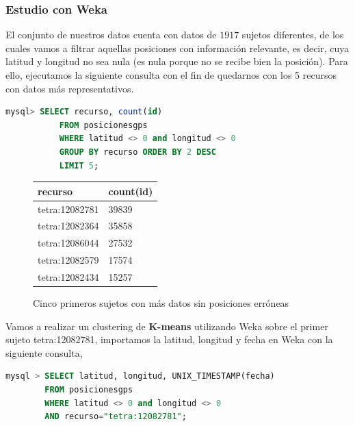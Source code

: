 \documentclass[a4paper, 12pt]{article}
\begin{document}
\subsubsection{Estudio con Weka}

El conjunto de nuestros datos cuenta con datos de $1917$ sujetos diferentes, de los cuales vamos a filtrar aquellas posiciones con informaci\'on relevante, es decir, cuya latitud y longitud no sea nula (es nula porque no se recibe bien la posici\'on). Para ello, ejecutamos la siguiente consulta con el fin de quedarnos con los 5 recursos con datos m\'as representativos.

\begin{lstlisting}[language=sql, basicstyle=\small, columns=fullflexible]
mysql> SELECT recurso, count(id)
           FROM posicionesgps
           WHERE latitud <> 0 and longitud <> 0
           GROUP BY recurso ORDER BY 2 DESC 
           LIMIT 5;

\end{lstlisting}


\begin{figure}[!htbp]
	\begin{center}
		\begin{tabular}{|l | l |}
			\hline
		\rowcolor{LightCyan}
		   \hline
           recurso & count(id) \\
           \hline
           tetra:12082781 & 39839 \\
           tetra:12082364 & 35858 \\
           tetra:12086044 & 27532 \\
           tetra:12082579 & 17574 \\
		   tetra:12082434 & 15257 \\		
		   \hline
		\end{tabular}
	\caption{Cinco primeros sujetos con m\'as datos sin posiciones err\'oneas}
	\end{center}
\end{figure}


Vamos a realizar un clustering de \textbf{K-means} utilizando Weka sobre el primer sujeto tetra:12082781, importamos la latitud, longitud y fecha en Weka con la siguiente consulta,

\begin{lstlisting}[language=sql, basicstyle=\small, columns=fullflexible]
mysql > SELECT latitud, longitud, UNIX_TIMESTAMP(fecha) 
		FROM posicionesgps
		WHERE latitud <> 0 and longitud <> 0 
		AND recurso="tetra:12082781";
\end{lstlisting}
\end{document}
